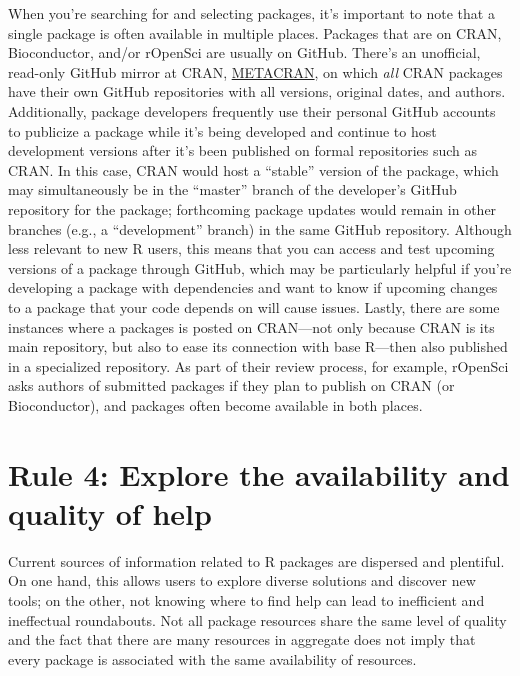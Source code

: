 \documentclass[10pt,letterpaper]{article}
\begin{document}
When you're searching for and selecting packages, it's important to note
that a single package is often available in multiple places. Packages
that are on CRAN, Bioconductor, and/or rOpenSci are usually on GitHub.
There's an unofficial, read-only GitHub mirror at CRAN,
\href{https://github.com/cran}{METACRAN}, on which \emph{all} CRAN
packages have their own GitHub repositories with all versions, original
dates, and authors. Additionally, package developers frequently use
their personal GitHub accounts to publicize a package while it's being
developed and continue to host development versions after it's been
published on formal repositories such as CRAN. In this case, CRAN would
host a ``stable'' version of the package, which may simultaneously be in
the ``master'' branch of the developer's GitHub repository for the
package; forthcoming package updates would remain in other branches
(e.g., a ``development'' branch) in the same GitHub repository. Although
less relevant to new R users, this means that you can access and test
upcoming versions of a package through GitHub, which may be particularly
helpful if you're developing a package with dependencies and want to
know if upcoming changes to a package that your code depends on will
cause issues. Lastly, there are some instances where a packages is
posted on CRAN---not only because CRAN is its main repository, but also
to ease its connection with base R---then also published in a
specialized repository. As part of their review process, for example,
rOpenSci asks authors of submitted packages if they plan to publish on
CRAN (or Bioconductor), and packages often become available in both
places.

\hypertarget{rule-4-explore-the-availability-and-quality-of-help}{%
\section{Rule 4: Explore the availability and quality of
help}\label{rule-4-explore-the-availability-and-quality-of-help}}

Current sources of information related to R packages are dispersed and
plentiful. On one hand, this allows users to explore diverse solutions
and discover new tools; on the other, not knowing where to find help can
lead to inefficient and ineffectual roundabouts. Not all package
resources share the same level of quality and the fact that there are
many resources in aggregate does not imply that every package is
associated with the same availability of resources.
\end{document}
